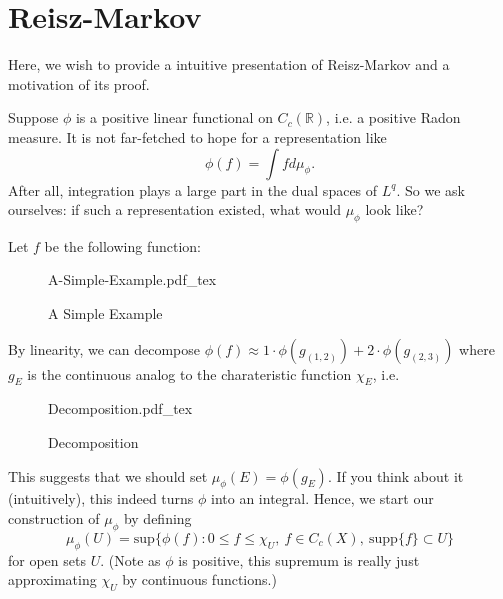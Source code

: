 \documentclass[12pt, letterpaper]{article}
\newcommand{\incfig}[2][1]{%
    \def\svgwidth{#1\columnwidth}
    {#2.pdf_tex}
}
\newcommand{\bR}{{\mathbb R}}
\begin{document}
\pagestyle{fancy}
\section*{Reisz-Markov}
Here, we wish to provide a intuitive presentation of Reisz-Markov and a motivation of its proof.

Suppose $\phi$ is a positive linear functional on $C_c(\bR)$, i.e. a positive Radon measure. It is not far-fetched to hope for a representation like
\[
    \phi(f) = \int f d \mu_\phi.
\]
After all, integration plays a large part in the dual spaces of $L^q$. So we ask ourselves: if such a representation existed, what would $\mu_\phi$ look like?

Let $f$ be the following function:
\begin{figure}[ht]
    \centering
    \incfig[0.5]{A-Simple-Example}
    \caption{A Simple Example}
    \label{fig:A-Simple-Example}
\end{figure}

By linearity, we can decompose $\phi(f) \approx 1 \cdot \phi(g_{(1,2)}) + 2 \cdot \phi(g_{(2,3)})$ where $g_E$ is the continuous analog to the charateristic function $\chi_E$, i.e.
\begin{figure}[ht]
    \centering
    \incfig[0.5]{Decomposition}
    \caption{Decomposition}
    \label{fig:Decomposition}
\end{figure}

This suggests that we should set $\mu_\phi(E) = \phi(g_E)$. If you think about it (intuitively), this indeed turns $\phi$ into an integral. Hence, we start our construction of $\mu_\phi$ by defining
\[
    \mu_\phi(U) = \text{sup}\{\phi(f): 0 \leq f \leq \chi_U, \ f \in C_c(X), \ \text{supp}\{f\} \subset U\}
\]
for open sets $U$. (Note as $\phi$ is positive, this supremum is really just approximating $\chi_U$ by continuous functions.)
\end{document}

